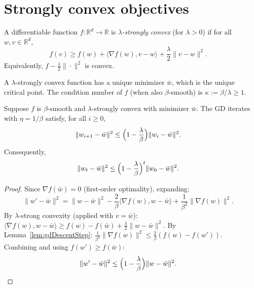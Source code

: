 \section{Strongly convex objectives}
\label{sec:strong-convexity}

\begin{definition}\label{def:stronglyConvex}
  \leanok
A differentiable function $f : \mathbb{R}^d \to \mathbb{R}$ is \emph{$\lambda$-strongly convex} (for $\lambda > 0$) if for all $w, v \in \mathbb{R}^d$,
\[
  f(v) \ge f(w) + \langle \nabla f(w), v - w \rangle + \frac{\lambda}{2}\|v - w\|^2.
\]
Equivalently, $f - \frac{\lambda}{2}\|\cdot\|^2$ is convex.
\end{definition}

\begin{remark}
A $\lambda$-strongly convex function has a unique minimizer $\bar{w}$, which is the unique critical point.
The condition number of $f$ (when also $\beta$-smooth) is $\kappa := \beta/\lambda \ge 1$.
\end{remark}

\begin{theorem}\label{thm:gdStronglyConvex}
Suppose $f$ is $\beta$-smooth and $\lambda$-strongly convex with minimizer $\bar{w}$.
The GD iterates with $\eta = 1/\beta$ satisfy, for all $i \ge 0$,
\[
  \|w_{i+1} - \bar{w}\|^2 \le \Bigl(1 - \frac{\lambda}{\beta}\Bigr) \|w_i - \bar{w}\|^2.
\]
Consequently,
\[
  \|w_t - \bar{w}\|^2 \le \Bigl(1 - \frac{\lambda}{\beta}\Bigr)^t \|w_0 - \bar{w}\|^2.
\]
\end{theorem}

\begin{proof}
Since $\nabla f(\bar{w}) = 0$ (first-order optimality), expanding:
\[
  \|w' - \bar{w}\|^2
    = \|w - \bar{w}\|^2 - \frac{2}{\beta}\langle \nabla f(w), w - \bar{w}\rangle + \frac{1}{\beta^2}\|\nabla f(w)\|^2.
\]
By $\lambda$-strong convexity (applied with $v = \bar{w}$):
$\langle \nabla f(w), w - \bar{w}\rangle \ge f(w) - f(\bar{w}) + \frac{\lambda}{2}\|w - \bar{w}\|^2$.
By Lemma~\ref{lem:gdDescentStep}:
$\frac{1}{\beta^2}\|\nabla f(w)\|^2 \le \frac{2}{\beta}(f(w) - f(w'))$.
Combining and using $f(w') \ge f(\bar{w})$:
\[
  \|w' - \bar{w}\|^2 \le \Bigl(1 - \frac{\lambda}{\beta}\Bigr)\|w - \bar{w}\|^2.
\]
\end{proof}

